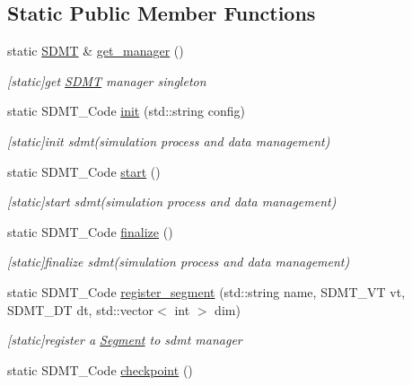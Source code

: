 \subsection*{Static Public Member Functions}
\begin{DoxyCompactItemize}
\item 
static \hyperlink{class_s_d_m_t}{S\+D\+MT} \& \hyperlink{class_s_d_m_t_a58f43a16728b4d990ca10c1efe70740f}{get\+\_\+manager} ()
\begin{DoxyCompactList}\small\item\em \mbox{[}static\mbox{]}get \hyperlink{class_s_d_m_t}{S\+D\+MT} manager singleton \end{DoxyCompactList}\item 
static S\+D\+M\+T\+\_\+\+Code \hyperlink{class_s_d_m_t_a6d177e96e25e852acc3f9bd273215f3c}{init} (std\+::string config)
\begin{DoxyCompactList}\small\item\em \mbox{[}static\mbox{]}init sdmt(simulation process and data management) \end{DoxyCompactList}\item 
static S\+D\+M\+T\+\_\+\+Code \hyperlink{class_s_d_m_t_a0ee438570acc7a74676693b86fdc94a9}{start} ()
\begin{DoxyCompactList}\small\item\em \mbox{[}static\mbox{]}start sdmt(simulation process and data management) \end{DoxyCompactList}\item 
static S\+D\+M\+T\+\_\+\+Code \hyperlink{class_s_d_m_t_af56c324524d2b8684f268b78d7e64534}{finalize} ()
\begin{DoxyCompactList}\small\item\em \mbox{[}static\mbox{]}finalize sdmt(simulation process and data management) \end{DoxyCompactList}\item 
static S\+D\+M\+T\+\_\+\+Code \hyperlink{class_s_d_m_t_a4da48bca02cad8bfe78a1bafec4a1b1f}{register\+\_\+segment} (std\+::string name, S\+D\+M\+T\+\_\+\+VT vt, S\+D\+M\+T\+\_\+\+DT dt, std\+::vector$<$ int $>$ dim)
\begin{DoxyCompactList}\small\item\em \mbox{[}static\mbox{]}register a \hyperlink{struct_s_d_m_t_1_1_segment}{Segment} to sdmt manager \end{DoxyCompactList}\item 
static S\+D\+M\+T\+\_\+\+Code \hyperlink{class_s_d_m_t_a65fbeacab1acd95ab0197af42de6b3b0}{checkpoint} ()

\end{DoxyCompactItemize}
